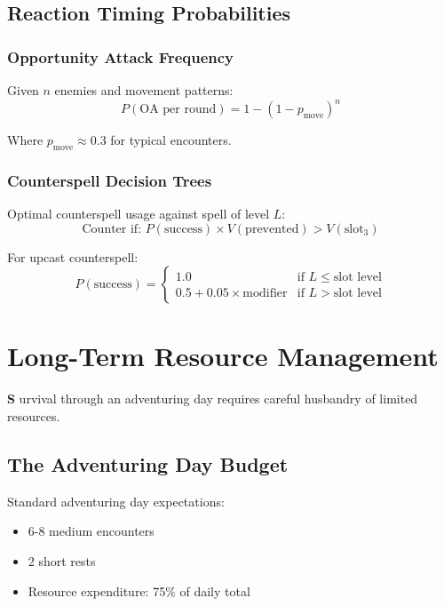 \documentclass[11pt,letterpaper,openany]{book}
\newcommand{\firstletter}[1]{%
    \textcolor{bloodred}{\fontsize{48}{48}\selectfont\bfseries #1}%
}
\begin{document}
\section{Reaction Timing Probabilities}

\subsection{Opportunity Attack Frequency}

Given $n$ enemies and movement patterns:
\begin{equation}
P(\text{OA per round}) = 1 - (1 - p_{\text{move}})^n
\end{equation}

Where $p_{\text{move}} \approx 0.3$ for typical encounters.

\subsection{Counterspell Decision Trees}

Optimal counterspell usage against spell of level $L$:
\begin{equation}
\text{Counter if: } P(\text{success}) \times V(\text{prevented}) > V(\text{slot}_3)
\end{equation}

For upcast counterspell:
\begin{equation}
P(\text{success}) = \begin{cases}
1.0 & \text{if } L \leq \text{slot level} \\
0.5 + 0.05 \times \text{modifier} & \text{if } L > \text{slot level}
\end{cases}
\end{equation}

\chapter{Long-Term Resource Management}

\firstletter{S}urvival through an adventuring day requires careful husbandry of limited resources.

\section{The Adventuring Day Budget}

Standard adventuring day expectations:
\begin{itemize}
    \item 6-8 medium encounters
    \item 2 short rests
    \item Resource expenditure: 75\% of daily total
\end{itemize}
\end{document}
